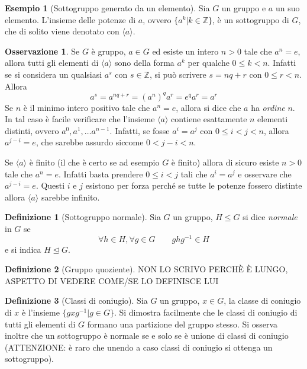 \documentclass[11pt]{article}
\theoremstyle{plain}
\theoremstyle{definition}
\newtheorem{defn}{Definizione}[section]
\newtheorem{exmp}{Esempio}[section]
\newtheorem*{rem}{Osservazione}
\theoremstyle{remark}
\newcommand{\Z}{\mathbb{Z}}
\begin{document}
\begin{exmp}[Sottogruppo generato da un elemento]
Sia $G$ un gruppo e $a$ un suo elemento. L'insieme delle potenze di $a$, ovvero $\{a^k | k\in\Z\}$, è un sottogruppo di $G$,
che di solito viene denotato con $\langle a\rangle$.
\end{exmp}

\begin{rem}
Se $G$ è gruppo, $a\in G$ ed esiste un intero $n>0$ tale che $a^n=e$, allora tutti gli elementi di $\langle a\rangle$ sono della forma
$a^k$ per qualche $0\le k < n$. Infatti se si considera un qualsiasi $a^s$ con $s\in\Z$, si può scrivere $s=nq+r$ con $0\le r<n$.
Allora \[a^s=a^{nq+r} = (a^n)^qa^r = e^qa^r = a^r\]
Se $n$ è il minimo intero positivo tale che $a^n=e$, allora si dice che $a$ ha \emph{ordine} $n$. In tal caso è facile verificare che
l'insieme $\langle a\rangle$ contiene esattamente $n$ elementi distinti, ovvero $a^0, a^1, \dots a^{n-1}$.
Infatti, se fosse $a^i=a^j$ con $0\le i<j<n$, allora $a^{j-i}=e$, che sarebbe assurdo siccome $0<j-i<n$.

Se $\langle a\rangle$ è finito (il che è certo se ad esempio $G$ è finito) allora di sicuro esiste $n>0$ tale che $a^n=e$. Infatti basta prendere $0\le i < j$
tali che $a^i = a^j$ e osservare che $a^{j-i} = e$. Questi $i$ e $j$ esistono per forza perché se tutte le potenze fossero distinte allora $\langle a\rangle$ sarebbe infinito.
\end{rem}


\begin{defn}[Sottogruppo normale]
Sia $G$ un gruppo, $H \leq G$ si dice \emph{normale} in $G$ se
\[
	\forall h\in H, \forall g\in G\qquad ghg^{-1}\in H
\]
e si indica $H \trianglelefteq G$.
\end{defn}

\begin{defn}[Gruppo quoziente]
NON LO SCRIVO PERCHÈ È LUNGO, ASPETTO DI VEDERE COME/SE LO DEFINISCE LUI
\end{defn}

\begin{defn}[Classi di coniugio]
Sia $G$ un gruppo, $x \in G$, la classe di coniugio di $x$ è l'insieme $\{ gxg^{-1} | g\in G \}$. Si dimostra facilmente che le classi di coniugio di tutti gli elementi di $G$ formano una partizione del gruppo stesso. Si osserva inoltre che un sottogruppo è normale se e solo se è unione di classi di coniugio (ATTENZIONE: è raro che unendo a caso classi di coniugio si ottenga un sottogruppo).
\end{defn}
\end{document}
